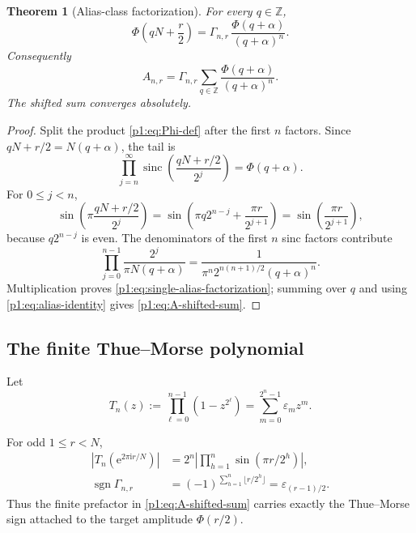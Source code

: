 \documentclass[11pt,oneside]{article}
\newtheorem{theorem}{Theorem}[section]
\theoremstyle{definition}
\theoremstyle{remark}
\newcommand{\Z}{\mathbb Z}
\newcommand{\sinc}{\operatorname{sinc}}
\newcommand{\e}{\mathrm e}
\newcommand{\ii}{\mathrm i}
\newcommand{\eps}{\varepsilon}
\newcommand{\PhiU}{\Phi}
\begin{document}
\begin{theorem}[Alias-class factorization]\label{p1:thm:alias-factorization}
For every $q\in\Z$,
\begin{equation}\label{p1:eq:single-alias-factorization}
 \PhiU\!\left(qN+\frac r2\right)
 =\Gamma_{n,r}\,
 \frac{\PhiU(q+\alpha)}{(q+\alpha)^n}.
\end{equation}
Consequently
\begin{equation}\label{p1:eq:A-shifted-sum}
 \boxed{
 A_{n,r}=\Gamma_{n,r}
 \sum_{q\in\Z}\frac{\PhiU(q+\alpha)}{(q+\alpha)^n}.}
\end{equation}
The shifted sum converges absolutely.
\end{theorem}

\begin{proof}
Split the product \eqref{p1:eq:Phi-def} after the first $n$ factors.  Since
$qN+r/2=N(q+\alpha)$, the tail is
\[
 \prod_{j=n}^{\infty}
 \sinc\!\left(\frac{qN+r/2}{2^j}\right)
 =\PhiU(q+\alpha).
\]
For $0\le j<n$,
\[
 \sin\!\left(\pi\frac{qN+r/2}{2^j}\right)
 =\sin\!\left(\pi q2^{n-j}+\frac{\pi r}{2^{j+1}}\right)
 =\sin\!\left(\frac{\pi r}{2^{j+1}}\right),
\]
because $q2^{n-j}$ is even.  The denominators of the first $n$ sinc factors
contribute
\[
 \prod_{j=0}^{n-1}\frac{2^j}{\pi N(q+\alpha)}
 =\frac{1}{\pi^n2^{n(n+1)/2}(q+\alpha)^n}.
\]
Multiplication proves \eqref{p1:eq:single-alias-factorization}; summing over $q$
and using \eqref{p1:eq:alias-identity} gives \eqref{p1:eq:A-shifted-sum}.
\end{proof}

\subsection{The finite Thue--Morse polynomial}

Let
\begin{equation}\label{p1:eq:T-n-polynomial}
 T_n(z):=\prod_{\ell=0}^{n-1}(1-z^{2^\ell})
 =\sum_{m=0}^{2^n-1}\eps_mz^m.
\end{equation}

\begin{proposition}\label{p1:prop:TM-sign-carrier}
For odd $1\le r<N$,
\begin{align}
 \left|T_n\!\left(\e^{2\pi\ii r/N}\right)\right|
 &=2^n\left|\prod_{h=1}^{n}\sin(\pi r/2^h)\right|,
 \label{p1:eq:T-root-magnitude}\\
 \operatorname{sgn}\Gamma_{n,r}
 &=(-1)^{\sum_{h=1}^{n}\lfloor r/2^h\rfloor}
 =\eps_{(r-1)/2}.
 \label{p1:eq:Gamma-sign}
\end{align}
Thus the finite prefactor in \eqref{p1:eq:A-shifted-sum} carries exactly the
Thue--Morse sign attached to the target amplitude $\PhiU(r/2)$.
\end{proposition}
\end{document}
